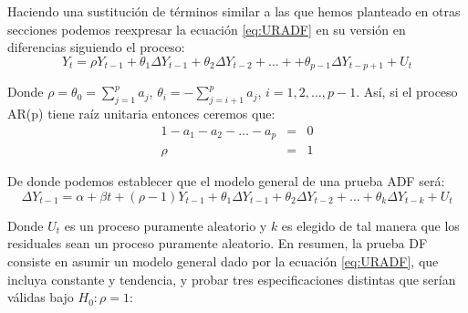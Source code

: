 \documentclass[
]{book}
\begin{document}
Haciendo una sustitución de términos similar a las que hemos planteado en otras secciones podemos reexpresar la ecuación \eqref{eq:URADF} en su versión en diferencias siguiendo el proceso:
\begin{equation}
    Y_t = \rho Y_{t-1} + \theta_1 \Delta Y_{t-1} + \theta_2 \Delta Y_{t-2} + \ldots + + \theta_{p-1} \Delta Y_{t-p+1} + U_t 
\end{equation}

Donde \(\rho = \theta_0 = \sum_{j = 1}^p a_j\), \(\theta_i = - \sum_{j = i + 1}^p a_j\), \(i = 1, 2, \ldots, p-1\). Así, si el proceso AR(p) tiene raíz unitaria entonces ceremos que:
\begin{eqnarray*}
    1 - a_1 - a_2 - \ldots - a_p & = & 0 \\
    \rho & = & 1
\end{eqnarray*}

De donde podemos establecer que el modelo general de una prueba ADF será:
\begin{equation}
    \Delta Y_{t-1} = \alpha + \beta t + (\rho - 1) Y_{t-1} + \theta_1 \Delta Y_{t-1} + \theta_2 \Delta Y_{t-2} + \ldots + \theta_k \Delta Y_{t-k} + U_t
\end{equation}

Donde \(U_t\) es un proceso puramente aleatorio y \(k\) es elegido de tal manera que los residuales sean un proceso puramente aleatorio. En resumen, la prueba DF consiste en asumir un modelo general dado por la ecuación \eqref{eq:URADF}, que incluya constante y tendencia, y probar tres especificaciones distintas que serían válidas bajo \(H_0 : \rho = 1\):
\end{document}

